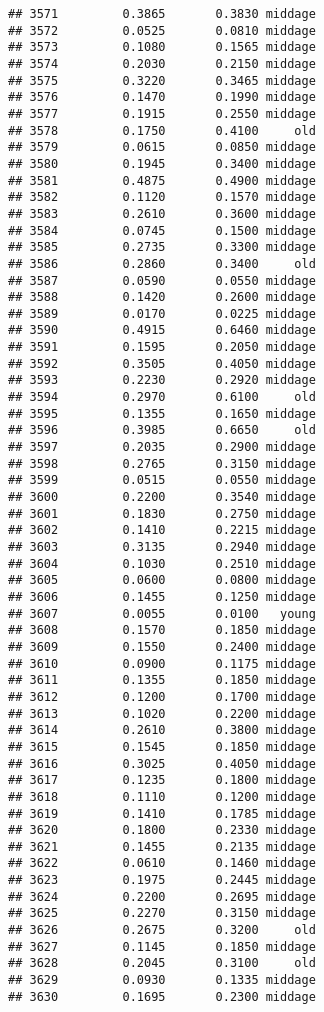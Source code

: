 \documentclass[
]{article}
\begin{document}
\begin{verbatim}
## 3571         0.3865       0.3830 middage
## 3572         0.0525       0.0810 middage
## 3573         0.1080       0.1565 middage
## 3574         0.2030       0.2150 middage
## 3575         0.3220       0.3465 middage
## 3576         0.1470       0.1990 middage
## 3577         0.1915       0.2550 middage
## 3578         0.1750       0.4100     old
## 3579         0.0615       0.0850 middage
## 3580         0.1945       0.3400 middage
## 3581         0.4875       0.4900 middage
## 3582         0.1120       0.1570 middage
## 3583         0.2610       0.3600 middage
## 3584         0.0745       0.1500 middage
## 3585         0.2735       0.3300 middage
## 3586         0.2860       0.3400     old
## 3587         0.0590       0.0550 middage
## 3588         0.1420       0.2600 middage
## 3589         0.0170       0.0225 middage
## 3590         0.4915       0.6460 middage
## 3591         0.1595       0.2050 middage
## 3592         0.3505       0.4050 middage
## 3593         0.2230       0.2920 middage
## 3594         0.2970       0.6100     old
## 3595         0.1355       0.1650 middage
## 3596         0.3985       0.6650     old
## 3597         0.2035       0.2900 middage
## 3598         0.2765       0.3150 middage
## 3599         0.0515       0.0550 middage
## 3600         0.2200       0.3540 middage
## 3601         0.1830       0.2750 middage
## 3602         0.1410       0.2215 middage
## 3603         0.3135       0.2940 middage
## 3604         0.1030       0.2510 middage
## 3605         0.0600       0.0800 middage
## 3606         0.1455       0.1250 middage
## 3607         0.0055       0.0100   young
## 3608         0.1570       0.1850 middage
## 3609         0.1550       0.2400 middage
## 3610         0.0900       0.1175 middage
## 3611         0.1355       0.1850 middage
## 3612         0.1200       0.1700 middage
## 3613         0.1020       0.2200 middage
## 3614         0.2610       0.3800 middage
## 3615         0.1545       0.1850 middage
## 3616         0.3025       0.4050 middage
## 3617         0.1235       0.1800 middage
## 3618         0.1110       0.1200 middage
## 3619         0.1410       0.1785 middage
## 3620         0.1800       0.2330 middage
## 3621         0.1455       0.2135 middage
## 3622         0.0610       0.1460 middage
## 3623         0.1975       0.2445 middage
## 3624         0.2200       0.2695 middage
## 3625         0.2270       0.3150 middage
## 3626         0.2675       0.3200     old
## 3627         0.1145       0.1850 middage
## 3628         0.2045       0.3100     old
## 3629         0.0930       0.1335 middage
## 3630         0.1695       0.2300 middage

\end{verbatim}
\end{document}

